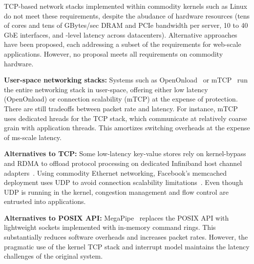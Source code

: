 TCP-based network stacks implemented within commodity kernels such as
Linux do not meet these requirements, despite the abudance of hardware
resources (tens of cores and tens of GBytes/sec DRAM and PCIe
bandwidth per server, 10 to 40 GbE interfaces, and \microsecond-level
latency across datacenters).
Alternative approaches have been proposed, each addressing a subset of
the requirements for web-scale applications. However, no
proposal meets all requirements on commodity hardware. 

{\bf User-space networking stacks:} Systems such as
OpenOnload~\cite{openonload} or mTCP~\cite{jeong2014mtcp} run the
entire networking stack in user-space, offering either low latency
(OpenOnload) or connection scalability (mTCP) at the expense of
protection. There are still tradeoffs between packet rate and
latency. For instance, mTCP uses dedicated hreads for the TCP
stack, which communicate at relatively coarse grain with application
threads. This amortizes switching overheads at the
expense of ms-scale latency.

{\bf Alternatives to TCP:} Some low-latency key-value stores rely on
kernel-bypass and RDMA to offload protocol processing on dedicated
Infiniband host channel
adapters~\cite{DBLP:conf/sosp/OngaroRSOR11,Jose:2011:MDH}.  Using
commodity Ethernet networking, Facebook's memcached deployment uses
UDP to avoid connection scalability
limitations~\cite{nishtala2013scaling}. Even though UDP is running in
the kernel, congestion management and flow control are entrusted into
applications.

{\bf Alternatives to POSIX API:} MegaPipe~\cite{han2012megapipe}
replaces the POSIX API with lightweight sockets implemented with
in-memory command rings. This substantially reduces software overheads
and increases packet rates. However, the pragmatic use of the kernel
TCP stack and interrupt model maintains the latency challenges of the
original system.

